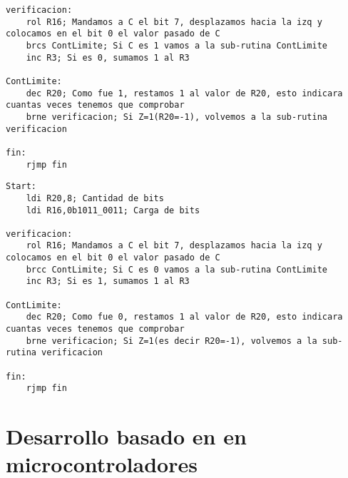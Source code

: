 \documentclass[
	12pt, %
	fleqn, %
	a4paper, %
]{LegrandOrangeBook}
\begin{document}
\begin{enumerate}
\begin{lstlisting}[language={[x86masm]Assembler},frame=single,caption={Contador de ceros},captionpos=b,numbers=none]
verificacion:
	rol R16; Mandamos a C el bit 7, desplazamos hacia la izq y colocamos en el bit 0 el valor pasado de C
	brcs ContLimite; Si C es 1 vamos a la sub-rutina ContLimite
	inc R3; Si es 0, sumamos 1 al R3

ContLimite:
	dec R20; Como fue 1, restamos 1 al valor de R20, esto indicara cuantas veces tenemos que comprobar
	brne verificacion; Si Z=1(R20=-1), volvemos a la sub-rutina verificacion

fin:
	rjmp fin
\end{lstlisting}
\begin{lstlisting}[language={[x86masm]Assembler},frame=single,caption={Contador de unos},captionpos=b,numbers=none]
Start:
	ldi R20,8; Cantidad de bits
	ldi R16,0b1011_0011; Carga de bits

verificacion:
	rol R16; Mandamos a C el bit 7, desplazamos hacia la izq y colocamos en el bit 0 el valor pasado de C
	brcc ContLimite; Si C es 0 vamos a la sub-rutina ContLimite
	inc R3; Si es 1, sumamos 1 al R3

ContLimite:
	dec R20; Como fue 0, restamos 1 al valor de R20, esto indicara cuantas veces tenemos que comprobar
	brne verificacion; Si Z=1(es decir R20=-1), volvemos a la sub-rutina verificacion

fin:
	rjmp fin
\end{lstlisting}
\end{enumerate}
\chapter{Desarrollo basado en en microcontroladores}
\end{document}
